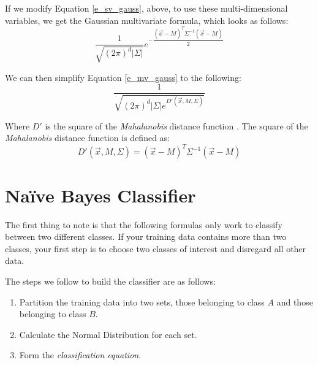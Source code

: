 \documentclass{article}
\begin{document}
If we modify Equation \ref{e_sv_gauss}, above, to use these
multi-dimensional variables, we get the Gaussian multivariate
formula\cite{wiki_mv_gauss}, which looks as follows:
\begin{equation}
\label{e_mv_gauss}
\dfrac{1}{\sqrt{(2\pi)^d |\Sigma|}} e^{-\dfrac{(\vec{x}-M)^T \Sigma^{-1} (\vec{x}-M)}{2}}
\end{equation}

We can then simplify Equation \ref{e_mv_gauss} to the following:
\begin{equation}
\label{e_mv_guass2}
\dfrac{1}{\sqrt{(2\pi)^d |\Sigma| e^{D'(\vec{x},M,\Sigma)}}}
\end{equation}

Where $D'$ is the square of the \emph{Mahalanobis} distance function
\cite{wiki_mahalanobis}.  The square of the \emph{Mahalanobis} distance
function is defined as:
\begin{displaymath}
  D'(\vec{x},M,\Sigma) = (\vec{x}-M)^T \Sigma^{-1} (\vec{x}-M)
\end{displaymath}


\section{Na\"ive Bayes Classifier}
\label{sec:nbayes}

The first thing to note is that the following formulas only work to
classify between two different classes.  If your training data
contains more than two classes, your first step is to choose two
classes of interest and disregard all other data.

The steps we follow to build the classifier are as follows:

\begin{enumerate}

\item Partition the training data into two sets, those belonging to class $A$
  and those belonging to class $B$.

\item Calculate the Normal Distribution for each set.

\item Form the \emph{classification equation}.

\end{enumerate}
\end{document}
